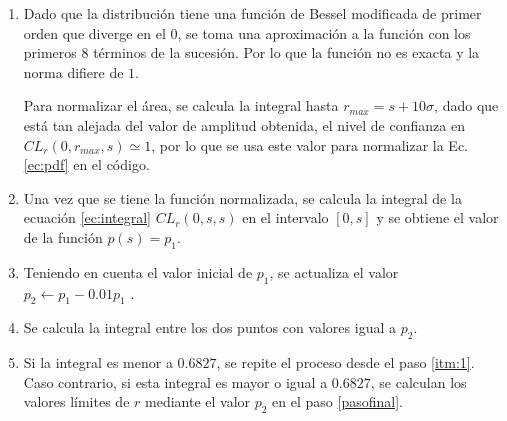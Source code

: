 \begin{enumerate}
    \item 
    Dado que la distribución tiene una función de Bessel modificada de primer orden que diverge en el 0, se toma una aproximación a la función con los primeros 8 términos de la sucesión. Por lo que la función no es exacta y la norma difiere de $1$. 
    
    Para normalizar el área, se calcula la integral hasta $r_{max}=s +  10\sigma$, dado que está tan alejada del valor de amplitud obtenida, el nivel de confianza en $CL_r(0,r_{max},s)\simeq 1$, por lo que se  usa este valor para normalizar la Ec. \ref{ec:pdf} en el código.

    \item Una vez que se tiene la función normalizada, se calcula la integral de la ecuación \ref{ec:integral} $CL_r(0,s,s)$ en el intervalo  $[0,s]$ y se obtiene el valor de la función $p(s)=p_1$.

        \item Teniendo en cuenta el valor inicial de $p_1$, se actualiza el valor  $p_2 \leftarrow p_1 - 0.01 p_1$ \label{itm:1}.
        \item Se calcula la integral entre los dos puntos con valores igual a $p_2$. 
        \item \label{itm:3} Si la integral es menor a $0.6827$, se repite el proceso desde el paso \ref{itm:1}. Caso contrario, si esta integral es mayor o igual a $0.6827$, se calculan los valores límites de $r$ mediante el valor $p_2$ en el paso \ref{pasofinal}. 


\end{enumerate}
